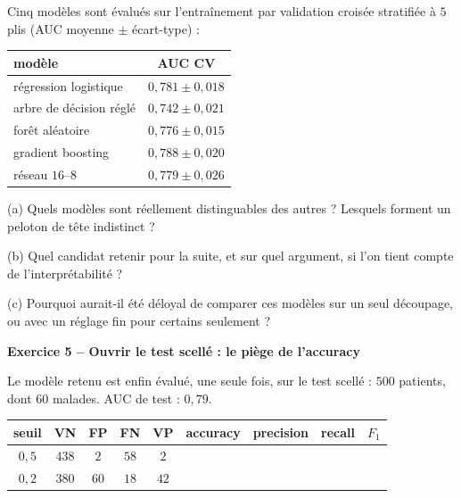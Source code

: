 \documentclass[10pt,a4paper]{article}
\newcommand{\repligne}{\par\vspace{0.42cm}\noindent\dotfill}
\begin{document}
Cinq modèles sont évalués sur l'entraînement par validation croisée stratifiée à $5$ plis (AUC moyenne $\pm$ écart-type) :

\vspace{0.1cm}
{\small \renewcommand{\arraystretch}{1.4}\begin{tabular}{|l|c|}\hline
modèle & AUC CV\\\hline
régression logistique & $0{,}781 \pm 0{,}018$\\\hline
arbre de décision réglé & $0{,}742 \pm 0{,}021$\\\hline
forêt aléatoire & $0{,}776 \pm 0{,}015$\\\hline
gradient boosting & $0{,}788 \pm 0{,}020$\\\hline
réseau $16$--$8$ & $0{,}779 \pm 0{,}026$\\\hline
\end{tabular}}

\vspace{0.2cm}
(a) Quels modèles sont réellement distinguables des autres ? Lesquels forment un peloton de tête indistinct ?
\repligne\repligne

\vspace{0.15cm}
(b) Quel candidat retenir pour la suite, et sur quel argument, si l'on tient compte de l'interprétabilité ?
\repligne\repligne

\vspace{0.15cm}
(c) Pourquoi aurait-il été déloyal de comparer ces modèles sur un seul découpage, ou avec un réglage fin pour certains seulement ?
\repligne

\vspace{0.45cm}
\textbf{\large Exercice 5 -- Ouvrir le test scellé : le piège de l'accuracy}
\vspace{0.15cm}

Le modèle retenu est enfin évalué, une seule fois, sur le test scellé : $500$ patients, dont $60$ malades. AUC de test : $0{,}79$.

\vspace{0.15cm}
{\small \renewcommand{\arraystretch}{1.9}\begin{tabular}{|c|c|c|c|c|c|c|c|c|}\hline
seuil & VN & FP & FN & VP & accuracy & precision & recall & $F_1$\\\hline
$0{,}5$ & $438$ & $2$ & $58$ & $2$ & & & & \\\hline
$0{,}2$ & $380$ & $60$ & $18$ & $42$ & & & & \\\hline
\end{tabular}}
\end{document}
